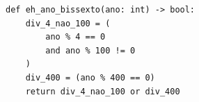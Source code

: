 \ifmostrarGabarito
\begin{verbatim}
def eh_ano_bissexto(ano: int) -> bool:
    div_4_nao_100 = (
        ano % 4 == 0
        and ano % 100 != 0
    )
    div_400 = (ano % 400 == 0)
    return div_4_nao_100 or div_400
\end{verbatim}

\fi
